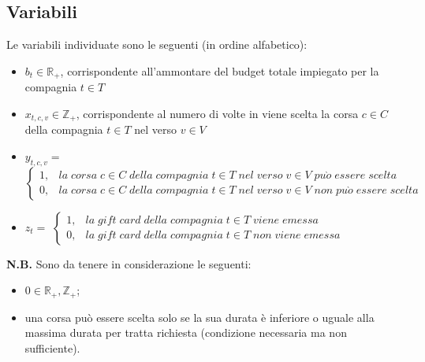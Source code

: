 \documentclass[main.tex]{subfiles}
\begin{document}
\subsection{Variabili}
Le variabili individuate sono le seguenti (in ordine alfabetico):
\begin{itemize}
    \item $b_t \in \mathbb{R}_+$, corrispondente all'ammontare del budget totale impiegato per la compagnia $t \in T$
    \item $x_{t,c,v} \in \mathbb{Z}_+$, corrispondente al numero di volte in viene scelta la corsa $c \in C$ della compagnia $t \in T$ nel verso $v \in V$
    \item $y_{t,c,v} =$
    \begin{math} { \begin{cases}
        1, & la\; corsa\; \text{$c \in C$}\; della\; compagnia\; \text{$t \in T$}\; nel\; verso\; \text{$v \in V$}\; pu\grave{o}\; essere\; scelta \\
        0, & la\; corsa\; \text{$c \in C$}\; della\; compagnia\; \text{$t \in T$}\; nel\; verso\; \text{$v \in V$}\; non\; pu\grave{o}\; essere\; scelta
    \end{cases} } \end{math}
    \item $z_t =$
    \begin{math} { \begin{cases}
        1, & la\; gift\; card\; della\; compagnia\; \text{$t \in T$}\; viene\; emessa \\
        0, & la\; gift\; card\; della\; compagnia\; \text{$t \in T$}\; non\; viene\; emessa 
    \end{cases} } \end{math}
\end{itemize}
\textbf{N.B.} Sono da tenere in considerazione le seguenti:
\begin{itemize}
    \item $0 \in \mathbb{R}_+, \mathbb{Z}_+$;
    \item una corsa può essere scelta solo se la sua durata è inferiore o uguale alla massima durata per tratta richiesta (condizione necessaria ma non sufficiente).
\end{itemize}
\end{document}
